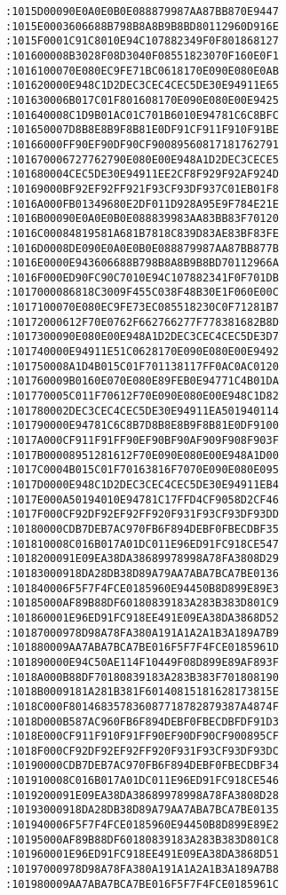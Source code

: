 \begin{lstlisting}[language={}, basicstyle=\scriptsize, caption=Машинний код]
:1015D00090E0A0E0B0E088879987AA87BB870E9447
:1015E0003606688B798B8A8B9B8BD80112960D916E
:1015F0001C91C8010E94C107882349F0F801868127
:101600008B3028F08D3040F08551823070F160E0F1
:1016100070E080EC9FE71BC0618170E090E080E0AB
:101620000E948C1D2DEC3CEC4CEC5DE30E94911E65
:101630006B017C01F801608170E090E080E00E9425
:101640008C1D9B01AC01C701B6010E94781C6C8BFC
:101650007D8B8E8B9F8B81E0DF91CF911F910F91BE
:10166000FF90EF90DF90CF90089560817181762791
:101670006727762790E080E00E948A1D2DEC3CECE5
:101680004CEC5DE30E94911EE2CF8F929F92AF924D
:10169000BF92EF92FF921F93CF93DF937C01EB01F8
:1016A000FB01349680E2DF011D928A95E9F784E21E
:1016B00090E0A0E0B0E088839983AA83BB83F70120
:1016C00084819581A681B7818C839D83AE83BF83FE
:1016D0008DE090E0A0E0B0E088879987AA87BB877B
:1016E0000E943606688B798B8A8B9B8BD70112966A
:1016F000ED90FC90C7010E94C107882341F0F701DB
:1017000086818C3009F455C038F48B30E1F060E00C
:1017100070E080EC9FE73EC085518230C0F71281B7
:10172000612F70E0762F662766277F778381682B8D
:1017300090E080E00E948A1D2DEC3CEC4CEC5DE3D7
:101740000E94911E51C0628170E090E080E00E9492
:101750008A1D4B015C01F701138117FF0AC0AC0120
:101760009B0160E070E080E89FEB0E94771C4B01DA
:101770005C011F70612F70E090E080E00E948C1D82
:101780002DEC3CEC4CEC5DE30E94911EA501940114
:101790000E94781C6C8B7D8B8E8B9F8B81E0DF9100
:1017A000CF911F91FF90EF90BF90AF909F908F903F
:1017B00008951281612F70E090E080E00E948A1D00
:1017C0004B015C01F70163816F7070E090E080E095
:1017D0000E948C1D2DEC3CEC4CEC5DE30E94911EB4
:1017E000A50194010E94781C17FFD4CF9058D2CF46
:1017F000CF92DF92EF92FF920F931F93CF93DF93DD
:10180000CDB7DEB7AC970FB6F894DEBF0FBECDBF35
:101810008C016B017A01DC011E96ED91FC918CE547
:1018200091E09EA38DA38689978998A78FA3808D29
:10183000918DA28DB38D89A79AA7ABA7BCA7BE0136
:101840006F5F7F4FCE0185960E94450B8D899E89E3
:10185000AF89B88DF60180839183A283B383D801C9
:101860001E96ED91FC918EE491E09EA38DA3868D52
:10187000978D98A78FA380A191A1A2A1B3A189A7B9
:101880009AA7ABA7BCA7BE016F5F7F4FCE0185961D
:101890000E94C50AE114F10449F08D899E89AF893F
:1018A000B88DF70180839183A283B383F701808190
:1018B0009181A281B381F60140815181628173815E
:1018C000F801468357836087718782879387A4874F
:1018D000B587AC960FB6F894DEBF0FBECDBFDF91D3
:1018E000CF911F910F91FF90EF90DF90CF900895CF
:1018F000CF92DF92EF92FF920F931F93CF93DF93DC
:10190000CDB7DEB7AC970FB6F894DEBF0FBECDBF34
:101910008C016B017A01DC011E96ED91FC918CE546
:1019200091E09EA38DA38689978998A78FA3808D28
:10193000918DA28DB38D89A79AA7ABA7BCA7BE0135
:101940006F5F7F4FCE0185960E94450B8D899E89E2
:10195000AF89B88DF60180839183A283B383D801C8
:101960001E96ED91FC918EE491E09EA38DA3868D51
:10197000978D98A78FA380A191A1A2A1B3A189A7B8
:101980009AA7ABA7BCA7BE016F5F7F4FCE0185961C

\end{lstlisting}
